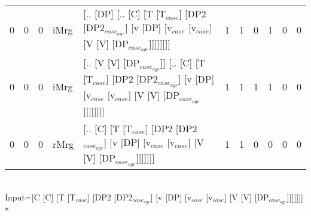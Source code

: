 \begin{tabularx}{\linewidth}{rrrlXrrrrrr}
   0 &       0 &   0 & iMrg & [.. [DP] [.. [C] [T [T$_{case}$] [DP2 [DP2$_{case_{agr}}$] [v [DP] [v$_{case}$ [v$_{case}$] [V [V] [DP$_{case_{agr}}$]]]]]]]]                                                                               &             1 &             1 &                  0 &            1 &              0 &             0 \\
   0 &       0 &   0 & iMrg & [.. [V [V] [DP$_{case_{agr}}$]] [.. [C] [T [T$_{case}$] [DP2 [DP2$_{case_{agr}}$] [v [DP] [v$_{case}$ [v$_{case}$] [V [V] [DP$_{case_{agr}}$]]]]]]]]                                                              &             1 &             1 &                  1 &            1 &              0 &             0 \\
   0 &       0 &   0 & rMrg & [.. [C] [T [T$_{case}$] [DP2 [DP2$_{case_{agr}}$] [v [DP] [v$_{case}$ [v$_{case}$] [V [V] [DP$_{case_{agr}}$]]]]]]]                                                                                         &             1 &             1 &                  0 &            0 &              0 &             0 \\
\hline
\end{tabularx}\endgroup\\
\begingroup\scriptsize Input=[C [C] [T [T$_{case}$] [DP2 [DP2$_{case_{agr}}$] [v [DP] [v$_{case}$ [v$_{case}$] [V [V] [DP$_{case_{agr}}$]]]]]]]\\*
